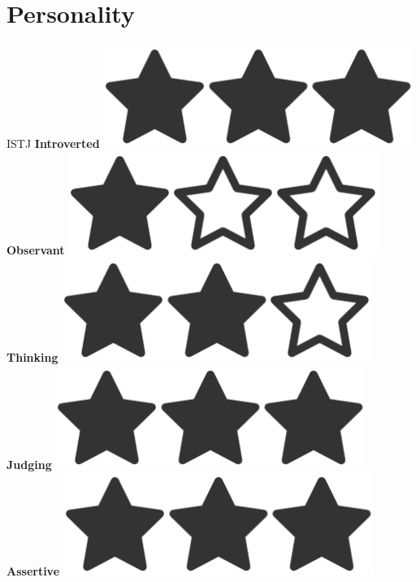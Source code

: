 \documentclass[]{friggeri-cv}
\begin{document}
\begin{aside}
~
~
~
  \section{Personality}
  	{ISTJ}
    \textbf{Introverted  }\includegraphics[scale=0.07]{img/3heart.png}
    \textbf{Observant  }\includegraphics[scale=0.07]{img/1heart.png}
    \textbf{Thinking  }\includegraphics[scale=0.07]{img/2heart.png}
    \textbf{Judging  }\includegraphics[scale=0.07]{img/3heart.png}
    \textbf{Assertive  }\includegraphics[scale=0.07]{img/3heart.png}    
    ~

\end{aside}
\end{document}
